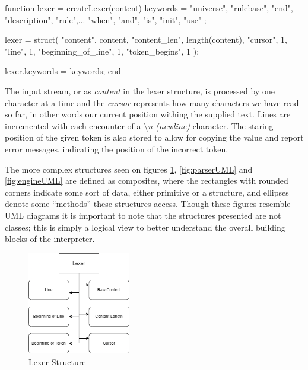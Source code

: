 \begin{octave}
function lexer = createLexer(content)
  keywords = {
    "universe", "rulebase", "end", "description", "rule",...
    "when", "and", "is", "init",  "use"
  };

  lexer = struct(
    "content", content,
    "content_len", length(content),
    "cursor", 1,
    "line", 1,
    "beginning_of_line", 1,
    "token_begins", 1
  );

  lexer.keywords = keywords;
end
\end{octave}

The input stream, or as \textit{content} in the lexer structure, is processed by one character at a time and the \textit{cursor} represents how many characters we have read so far, in other words our current position withing the supplied text. Lines are incremented with each encounter of a \textbackslash\textit{n (newline)} character. The staring position of the given token is also stored to allow for copying the value and report error messages, indicating the position of the incorrect token.

The more complex structures seen on figures \ref{fig:lexerUML}, \ref{fig:parserUML} and \ref{fig:engineUML} are defined as composites, where the rectangles with rounded corners indicate some sort of data, either primitive or a structure, and ellipses denote some ``methods'' these structures access. Though these figures resemble UML diagrams it is important to note that the structures presented are not classes; this is simply a logical view to better understand the overall building blocks of the interpreter.

\pagebreak

\begin{figure}
\centering
	\includegraphics[width=0.4\textwidth]{images/lexerUML}
	\caption{Lexer Structure}
	\label{fig:lexerUML}
\end{figure}


